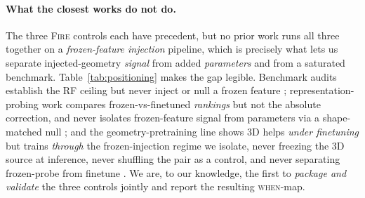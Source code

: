 \documentclass[sigconf,nonacm,anonymous,review]{acmart}
\begin{document}
\paragraph{What the closest works do not do.}
The three \textsc{Fire} controls each have precedent, but no prior work runs all
three together on a \emph{frozen-feature injection} pipeline, which is precisely
what lets us separate injected-geometry \emph{signal} from added
\emph{parameters} and from a saturated benchmark.
Table~\ref{tab:positioning} makes the gap legible. Benchmark audits establish
the RF ceiling but never inject or null a frozen feature
\citep{deng2023systematic,xia2023whydeep,praski2025embedding,wu2018moleculenet};
representation-probing work compares frozen-vs-finetuned \emph{rankings} but not
the absolute correction, and never isolates frozen-feature signal from
parameters via a shape-matched null \citep{wang2023molgrapheval,sun2022gnnpretrain};
and the geometry-pretraining line shows 3D helps \emph{under finetuning} but
trains \emph{through} the frozen-injection regime we isolate, never freezing the
3D source at inference, never shuffling the pair as a control, and never
separating frozen-probe from finetune
\citep{zhou2023unimol,qiao2025scage,wang2023threedpgt,hamakawa2025conformation}.
We are, to our knowledge, the first to \emph{package and validate} the three
controls jointly and report the resulting \textsc{when}-map.
\end{document}
